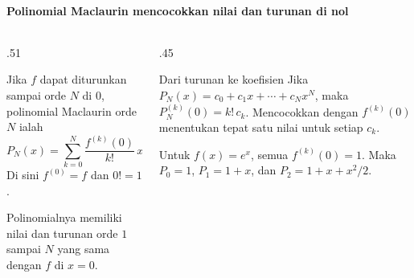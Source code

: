 \documentclass{../../kalkulus-ppt}
\begin{document}
\begin{frame}{\insertsection}
    \framesubtitle{Polinomial Maclaurin mencocokkan nilai dan turunan di nol}
    \begin{columns}[c,onlytextwidth]
        \begin{column}{.51\textwidth}
            \begin{definisi}
                Jika $f$ dapat diturunkan sampai orde $N$ di $0$,
                polinomial Maclaurin orde $N$ ialah
                \[
                    P_N(x)=\sum_{k=0}^N\frac{f^{(k)}(0)}{k!}\,x^k.
                \]
                Di sini $f^{(0)}=f$ dan $0!=1$.
            \end{definisi}
            Polinomialnya memiliki nilai dan turunan orde
            $1$ sampai $N$ yang sama dengan $f$ di $x=0$.
        \end{column}
        \begin{column}{.45\textwidth}
            \begin{block}{Dari turunan ke koefisien}
                Jika $P_N(x)=c_0+c_1x+\cdots+c_Nx^N$,
                maka $P_N^{(k)}(0)=k!\,c_k$.
                Mencocokkan dengan $f^{(k)}(0)$ menentukan
                tepat satu nilai untuk setiap $c_k$.
            \end{block}
            \begin{contoh}
                Untuk $f(x)=e^x$, semua $f^{(k)}(0)=1$.
                Maka $P_0=1$, $P_1=1+x$, dan
                $P_2=1+x+x^2/2$.
            \end{contoh}
        \end{column}
    \end{columns}
\end{frame}
\end{document}
